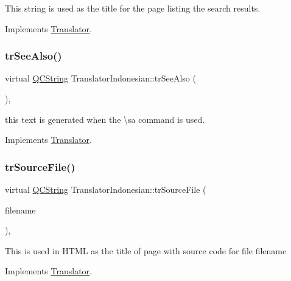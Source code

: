 This string is used as the title for the page listing the search results. 

Implements \mbox{\hyperlink{class_translator}{Translator}}.

\mbox{\label{class_translator_indonesian_af77f21958ac919bab82fa34dbbe2f4d6}} 
\subsubsection{\texorpdfstring{trSeeAlso()}{trSeeAlso()}}
{\footnotesize\ttfamily virtual \mbox{\hyperlink{class_q_c_string}{Q\+C\+String}} Translator\+Indonesian\+::tr\+See\+Also (\begin{DoxyParamCaption}{ }\end{DoxyParamCaption})\hspace{0.3cm}{\ttfamily [inline]}, {\ttfamily [virtual]}}

this text is generated when the \textbackslash{}sa command is used. 

Implements \mbox{\hyperlink{class_translator}{Translator}}.

\mbox{\label{class_translator_indonesian_a6369756ab29fc9c434408787414f628d}} 
\subsubsection{\texorpdfstring{trSourceFile()}{trSourceFile()}}
{\footnotesize\ttfamily virtual \mbox{\hyperlink{class_q_c_string}{Q\+C\+String}} Translator\+Indonesian\+::tr\+Source\+File (\begin{DoxyParamCaption}\item[{\mbox{\hyperlink{class_q_c_string}{Q\+C\+String}} \&}]{filename }\end{DoxyParamCaption})\hspace{0.3cm}{\ttfamily [inline]}, {\ttfamily [virtual]}}

This is used in H\+T\+ML as the title of page with source code for file filename 

Implements \mbox{\hyperlink{class_translator}{Translator}}.

